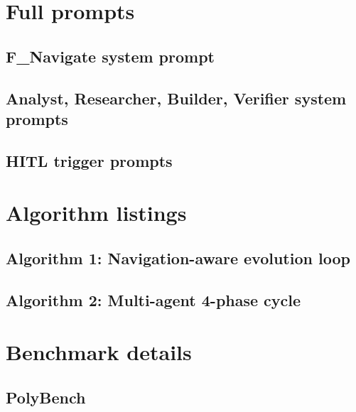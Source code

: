 
\section{Full prompts}
\label{app:prompts}

\subsection{F\_Navigate system prompt}

\subsection{Analyst, Researcher, Builder, Verifier system prompts}

\subsection{HITL trigger prompts}

\section{Algorithm listings}
\label{app:algos}

\subsection{Algorithm 1: Navigation-aware evolution loop}

\subsection{Algorithm 2: Multi-agent 4-phase cycle}

\section{Benchmark details}
\label{app:benchmarks}

\subsection{PolyBench}

